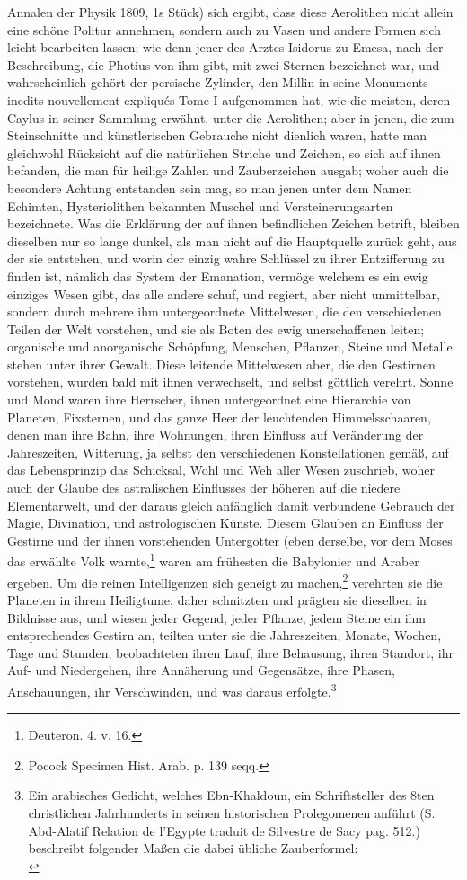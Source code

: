 \documentclass[a4paper, 11pt, oneside, polutonikogreek, german]{article}
\begin{document}
Annalen der Physik 1809, 1s Stück) sich ergibt, dass diese Aerolithen nicht allein eine schöne Politur annehmen, sondern auch zu Vasen und andere Formen sich leicht bearbeiten lassen; wie denn jener des Arztes Isidorus zu Emesa, nach der Beschreibung, die Photius von ihm gibt, mit zwei Sternen bezeichnet war, und wahrscheinlich gehört der persische Zylinder, den Millin in seine Monuments inedits nouvellement expliqués Tome I aufgenommen hat, wie die meisten, deren Caylus in seiner Sammlung erwähnt, unter die Aerolithen; aber in jenen, die zum Steinschnitte und künstlerischen Gebrauche nicht dienlich waren, hatte man gleichwohl Rücksicht auf die natürlichen Striche und Zeichen, so sich auf ihnen befanden, die man für heilige Zahlen und Zauberzeichen ausgab; woher auch die besondere Achtung entstanden sein mag, so man jenen unter dem Namen Echimten, Hysteriolithen bekannten Muschel und Versteinerungsarten bezeichnete. Was die Erklärung der auf ihnen befindlichen Zeichen betrift, bleiben dieselben nur so lange dunkel, als man nicht auf die Hauptquelle zurück geht, aus der sie entstehen, und worin der einzig wahre Schlüssel zu ihrer Entzifferung zu finden ist, nämlich das System der Emanation, vermöge welchem es ein ewig einziges Wesen gibt, das alle andere schuf, und regiert, aber nicht unmittelbar, sondern durch mehrere ihm untergeordnete Mittelwesen, die den verschiedenen Teilen der Welt vorstehen, und sie als Boten des ewig unerschaffenen leiten; organische und anorganische Schöpfung, Menschen, Pflanzen, Steine und Metalle stehen unter ihrer Gewalt. Diese leitende Mittelwesen aber, die den Gestirnen vorstehen, wurden bald mit ihnen verwechselt, und selbst göttlich verehrt. Sonne und Mond waren ihre Herrscher, ihnen untergeordnet eine Hierarchie von Planeten, Fixsternen, und das ganze Heer der leuchtenden Himmelsschaaren, denen man ihre Bahn, ihre Wohnungen, ihren Einfluss auf Veränderung der Jahreszeiten, Witterung, ja selbst den verschiedenen Konstellationen gemäß, auf das Lebensprinzip das Schicksal, Wohl und Weh aller Wesen zuschrieb, woher auch der Glaube des astralischen Einflusses der höheren auf die niedere Elementarwelt, und der daraus gleich anfänglich damit verbundene Gebrauch der Magie, Divination, und astrologischen Künste. Diesem Glauben an Einfluss der Gestirne und der ihnen vorstehenden Untergötter (eben derselbe, vor dem Moses das erwählte Volk warnte,\footnote{Deuteron. 4. v. 16.} waren am frühesten die Babylonier und Araber ergeben. Um die reinen Intelligenzen sich geneigt zu machen,\footnote{Pocock Specimen Hist. Arab. p. 139 seqq.} verehrten sie die Planeten in ihrem Heiligtume, daher schnitzten und prägten sie dieselben in Bildnisse aus, und wiesen jeder Gegend, jeder Pflanze, jedem Steine ein ihm entsprechendes Gestirn an, teilten unter sie die Jahreszeiten, Monate, Wochen, Tage und Stunden, beobachteten ihren Lauf, ihre Behausung, ihren Standort, ihr Auf- und Niedergehen, ihre Annäherung und Gegensätze, ihre Phasen, Anschauungen, ihr Verschwinden, und was daraus erfolgte.\footnote{Ein arabisches Gedicht, welches Ebn-Khaldoun, ein Schriftsteller des 8ten christlichen Jahrhunderts in seinen historischen Prolegomenen anführt (S. Abd-Alatif Relation de l'Egypte traduit de Silvestre de Sacy pag. 512.) beschreibt folgender Maßen die dabei übliche Zauberformel:\\
}
\end{document}
